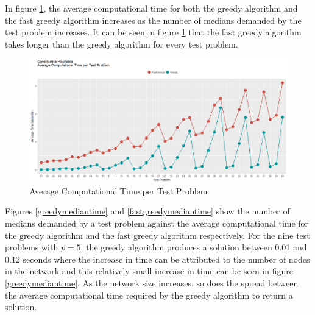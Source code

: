 \documentclass[11pt]{article}
\begin{document}
	In figure \ref{CH.av.time}, the average computational time for both the greedy algorithm and the fast greedy algorithm increases as the number of medians demanded by the test problem increases.  It can be seen in figure \ref{CH.av.time} that the fast greedy algorithm takes longer than the greedy algorithm for every test problem.
	
	\begin{figure}[H]
		\begin{center}
			\includegraphics[width=14cm]{CHavtime.png}
			\caption{Average Computational Time per Test Problem}
			\label{CH.av.time}
		\end{center}
	\end{figure}

	Figures \ref{greedymediantime} and \ref{fastgreedymediantime} show the number of medians demanded by a test problem against the average computational time for the greedy algorithm and the fast greedy algorithm respectively.  For the nine test problems with $p=5$, the greedy algorithm produces a solution between 0.01 and 0.12 seconds where the increase in time can be attributed to the number of nodes in the network and this relatively small increase in time can be seen in figure \ref{greedymediantime}.  As the network size increases, so does the spread between the average computational time required by the greedy algorithm to return a solution.    
\end{document}
